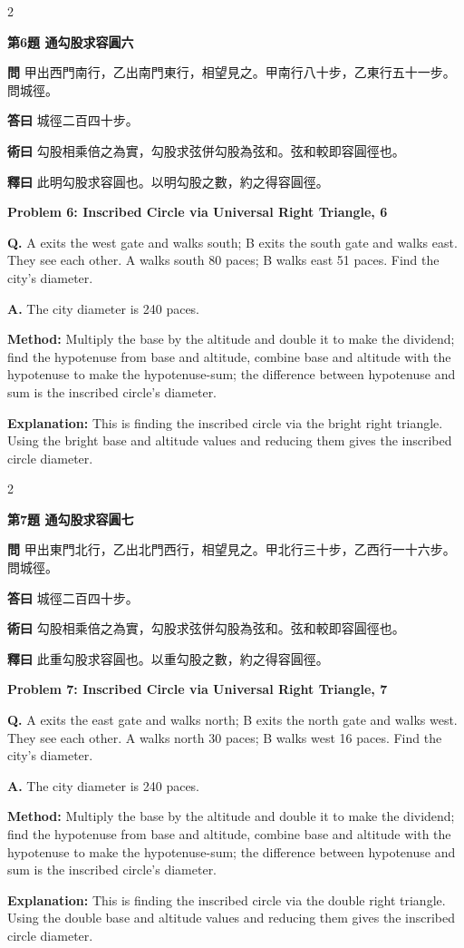\documentclass[11pt,a4paper]{article}
\newcommand{\wen}[1]{\noindent\textbf{問} #1\par\smallskip}
\newcommand{\da}[1]{\noindent\textbf{答曰} #1\par\smallskip}
\newcommand{\shu}[1]{\noindent\textbf{術曰} #1\par\smallskip}
\newcommand{\shi}[1]{\noindent\textbf{釋曰} #1\par\smallskip}
\newcommand{\wenE}[1]{\noindent\textbf{Q.} #1\par\smallskip}
\newcommand{\daE}[1]{\noindent\textbf{A.} #1\par\smallskip}
\newcommand{\shuE}[1]{\noindent\textbf{Method:} #1\par\smallskip}
\newcommand{\shiE}[1]{\noindent\textbf{Explanation:} #1\par\smallskip}
\begin{document}
\bigskip

\begin{paracol}{2}

\noindent\textbf{第6題 通勾股求容圓六}

\wen{甲出西門南行，乙出南門東行，相望見之。甲南行八十步，乙東行五十一步。問城徑。}
\da{城徑二百四十步。}
\shu{勾股相乘倍之為實，勾股求弦併勾股為弦和。弦和較即容圓徑也。}
\shi{此明勾股求容圓也。以明勾股之數，約之得容圓徑。}

\switchcolumn

\noindent\textbf{Problem 6: Inscribed Circle via Universal Right Triangle, 6}

\wenE{A exits the west gate and walks south; B exits the south gate and walks east. They see each other. A walks south 80 paces; B walks east 51 paces. Find the city's diameter.}
\daE{The city diameter is 240 paces.}
\shuE{Multiply the base by the altitude and double it to make the dividend; find the hypotenuse from base and altitude, combine base and altitude with the hypotenuse to make the hypotenuse-sum; the difference between hypotenuse and sum is the inscribed circle's diameter.}
\shiE{This is finding the inscribed circle via the bright right triangle. Using the bright base and altitude values and reducing them gives the inscribed circle diameter.}

\end{paracol}

\bigskip

\begin{paracol}{2}

\noindent\textbf{第7題 通勾股求容圓七}

\wen{甲出東門北行，乙出北門西行，相望見之。甲北行三十步，乙西行一十六步。問城徑。}
\da{城徑二百四十步。}
\shu{勾股相乘倍之為實，勾股求弦併勾股為弦和。弦和較即容圓徑也。}
\shi{此重勾股求容圓也。以重勾股之數，約之得容圓徑。}

\switchcolumn

\noindent\textbf{Problem 7: Inscribed Circle via Universal Right Triangle, 7}

\wenE{A exits the east gate and walks north; B exits the north gate and walks west. They see each other. A walks north 30 paces; B walks west 16 paces. Find the city's diameter.}
\daE{The city diameter is 240 paces.}
\shuE{Multiply the base by the altitude and double it to make the dividend; find the hypotenuse from base and altitude, combine base and altitude with the hypotenuse to make the hypotenuse-sum; the difference between hypotenuse and sum is the inscribed circle's diameter.}
\shiE{This is finding the inscribed circle via the double right triangle. Using the double base and altitude values and reducing them gives the inscribed circle diameter.}

\end{paracol}
\end{document}

